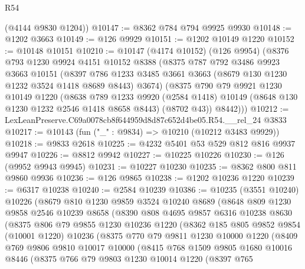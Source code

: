 \begin{lexlean}{R54}
\begin{coremodule}
      (@4144 @9830 @1204))
@10147 := @8362 @784 @794 @9925 @9930
@10148 := @1202 @3663
@10149 := @126 @9929
@10151 := @1202 @10149 @1220
@10152 := @10148 @10151
@10210 := @10147
    (@4174 @10152)
    (@126 @9954)
    (@8376
      @793
      @1230
      @9924
      @4151
      @10152
      @8388
      (@8375
        @787
        @792
        @3486
        @9923
        @3663
        @10151
        (@8397 @786 @1233 @3485 @3661 @3663 (@8679 @130 @1230 @1232 @3524 @1418 @8689 @8443) @3674)
        (@8375
          @790
          @79
          @9921
          @1230
          @10149
          @1220
          (@8638
            @789
            @1233
            @9920
            (@2584 @1418)
            @10149
            (@8648 @130 @1230 @1232 @2546 @1418 @8658 @8443)
            (@8702 @43))
          @8442)))
@10212 := LexLeanPreserve.C69a0078cb8f644959d8d87c652d4be05.R54.__rel_24 @3833
@10217 := @10143 (fun ("_" : @9834) => @10210 (@10212 @3483 @9929))
@10218 := @9833 @2618
@10225 := @4232 @5401 @53 @529 @812 @816 @9937 @9947
@10226 := @8812 @9942
@10227 := @10225 @10226
@10230 := @126 (@9952 @9943 @9945)
@10231 := @10227 @10230
@10235 := @8362 @800 @811 @9860 @9936
@10236 := @126 @9865
@10238 := @1202 @10236 @1220
@10239 := @6317 @10238
@10240 := @2584 @10239
@10386 := @10235
    (@3551 @10240)
    @10226
    (@8679
      @810
      @1230
      @9859
      @3524
      @10240
      @8689
      (@8648
        @809
        @1230
        @9858
        @2546
        @10239
        @8658
        (@8390
          @808
          @4695
          @9857
          @6316
          @10238
          @8630
          (@8375
            @806
            @79
            @9855
            @1230
            @10236
            @1220
            (@8362
              @185
              @805
              @9852
              @9854
              (@10001 @1220)
              @10236
              (@8375
                @770
                @79
                @9811
                @1230
                @10000
                @1220
                (@8409
                  @769
                  @9806
                  @9810
                  @10017
                  @10000
                  (@8415
                    @768
                    @1509
                    @9805
                    @1680
                    @10016
                    @8446
                    (@8375
                      @766
                      @79
                      @9803
                      @1230
                      @10014
                      @1220
                      (@8397
                        @765

\end{coremodule}
\end{lexlean}
